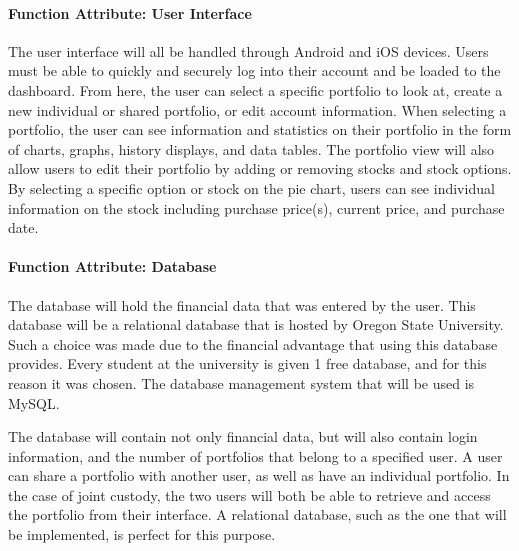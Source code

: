 \documentclass[onecolumn, draftclsnofoot,10pt, compsoc]{IEEEtran}
\begin{document}
\paragraph{Function Attribute: User Interface}
        The user interface will all be handled through Android and iOS devices. Users must be able to quickly and
        securely log into their account and be loaded to the dashboard. From here, the user can select a specific
        portfolio to look at, create a new individual or shared portfolio, or edit account information.
        When selecting a portfolio, the user can see information and statistics on their portfolio in the 
        form of charts, graphs, history displays, and data tables. The portfolio view will also allow users to edit their
        portfolio by adding or removing stocks and stock options. By selecting a specific option or stock on the
        pie chart, users can see individual information on the stock including purchase price(s), current price,
        and purchase date.
        
\paragraph{Function Attribute: Database}
        The database will hold the financial data that was entered by the user. This database will be a relational database that is hosted by Oregon State University. Such a choice was
        made due to the financial advantage that using this database provides. Every student at the university is given 1 free database, and for this reason it was chosen. The database
        management system that will be used is MySQL.

        The database will contain not only financial data, but will also contain login information, and the number of portfolios that belong to a specified user. A user can share a portfolio
        with another user, as well as have an individual portfolio. In the case of joint custody, the two users will both be able to retrieve and access the portfolio from their interface.
        A relational database, such as the one that will be implemented, is perfect for this purpose.
\end{document}
